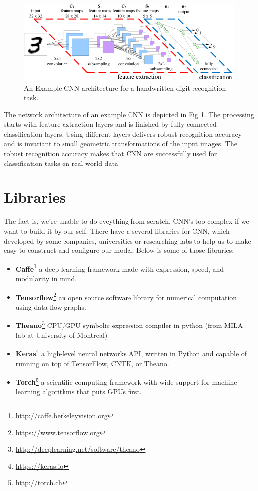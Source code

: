 \documentclass[hidelinks,12pt,a4paper]{report}
\begin{document}
\begin{figure}[ht]
	\includegraphics[scale=1, center]{images/Fig-1-An-Example-CNN-architecture-for-a-handwritten-digit-recognition-task}
	\caption{An Example CNN architecture for a handwritten digit recognition task.}
	\label{fig:CNN-architecture}
\end{figure}
The network architecture of an example CNN is depicted in Fig \ref{fig:CNN-architecture}. The processing starts with feature extraction layers and is finished by fully connected classification layers. Using different layers delivers robust recognition accuracy and is invariant to small geometric transformations of the input images. The robust recognition accuracy makes that CNN are successfully used for classification tasks on real world data

\section{Libraries}
The fact is, we're unable to do eveything from scratch, CNN's too complex if we want to build it by our self. There have a several libraries for CNN, which developed by some companies, universities or researching labs to help us to make easy to construct and configure our model. Below is some of those libraries:
\begin{itemize}
	\item \textbf{Caffe}\footnote{\url{http://caffe.berkeleyvision.org}} a deep learning framework made with expression, speed, and modularity in mind.
	\item \textbf{Tensorflow}\footnote{\url{https://www.tensorflow.org}} an open source software library for numerical computation using data flow graphs.
	\item \textbf{Theano}\footnote{\url{http://deeplearning.net/software/theano}} CPU/GPU symbolic expression compiler in python (from MILA lab at University of Montreal)
	\item \textbf{Keras}\footnote{\url{https://keras.io}} a high-level neural networks API, written in Python and capable of running on top of TensorFlow, CNTK, or Theano.
	\item \textbf{Torch}\footnote{\url{http://torch.ch}} a scientific computing framework with wide support for machine learning algorithms that puts GPUs first. 
\end{itemize}
\end{document}
